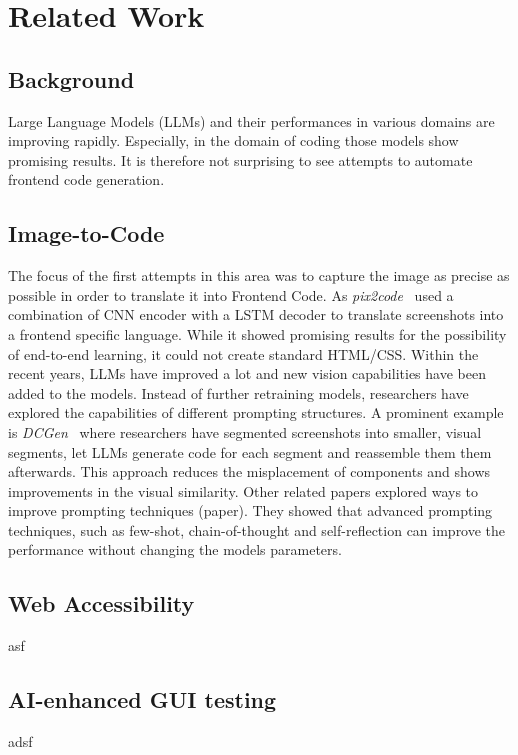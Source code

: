 \chapter{Related Work}\label{chapter:RelatedWork}

\section{Background}
Large Language Models (LLMs) and their performances in various domains are improving 
rapidly. Especially, in the domain of coding those models show promising results. 
It is therefore not surprising to see attempts to automate frontend code generation.

\section{Image-to-Code}
The focus of the first attempts in this area was to capture the image as precise as 
possible in order to translate it into Frontend Code. As \textit{pix2code}~\parencite{beltramelli2017pix2code} 
used a combination of CNN encoder with a LSTM decoder to translate screenshots into 
a frontend specific language. While it showed promising results for the possibility 
of end-to-end learning, it could not create standard HTML/CSS.\newline
Within the recent years, LLMs have improved a lot and new vision capabilities have been 
added to the models. Instead of further retraining models, researchers have 
explored the capabilities of different prompting structures. A prominent example is
\textit{DCGen}~\parencite{wan2024dcgen} where researchers have segmented screenshots 
into smaller, visual segments, let LLMs generate code for each segment and reassemble 
them them afterwards. This approach reduces the misplacement of components and shows
improvements in the visual similarity.\newline
Other related papers explored ways to improve prompting techniques (paper). They 
showed that advanced prompting techniques, such as few-shot, chain-of-thought and 
self-reflection can improve the performance without changing the models parameters.


\section{Web Accessibility}
asf

\section{AI-enhanced GUI testing}
adsf
